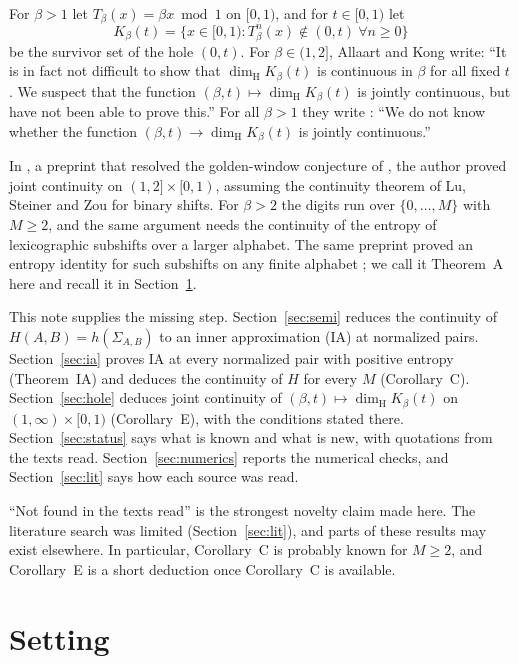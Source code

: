 \documentclass[11pt]{amsart}
\theoremstyle{definition}
\theoremstyle{remark}
\newcommand{\dimH}{\dim_{\mathrm H}}
\begin{document}
For $\beta>1$ let $T_\beta(x)=\beta x\bmod1$ on $[0,1)$, and for $t\in[0,1)$ let
\[
K_\beta(t)=\{x\in[0,1):T_\beta^n(x)\notin(0,t)\ \forall n\ge0\}
\]
be the survivor set of the hole $(0,t)$. For $\beta\in(1,2]$, Allaart and Kong \cite[Remark~1.10, arXiv v2]{AKcrit} write: ``It is in fact not difficult to show that $\dimH K_\beta(t)$ is continuous in $\beta$ for all fixed $t$. We suspect that the function $(\beta,t)\mapsto\dimH K_\beta(t)$ is jointly continuous, but have not been able to prove this.'' For all $\beta>1$ they write \cite[Remark~1.2, arXiv v3]{AKgen}: ``We do not know whether the function $(\beta,t)\to\dimH K_\beta(t)$ is jointly continuous.''

In \cite[Theorem~E]{Nem26}, a preprint that resolved the golden-window conjecture of \cite{v1}, the author proved joint continuity on $(1,2]\times[0,1)$, assuming the continuity theorem of Lu, Steiner and Zou \cite[Theorem~1.4]{LSZ} for binary shifts. For $\beta>2$ the digits run over $\{0,\dots,M\}$ with $M\ge2$, and the same argument needs the continuity of the entropy of lexicographic subshifts over a larger alphabet. The same preprint proved an entropy identity for such subshifts on any finite alphabet \cite[Theorem~7.1]{Nem26}; we call it Theorem~A here and recall it in Section~\ref{sec:setting}.

This note supplies the missing step. Section~\ref{sec:semi} reduces the continuity of $H(A,B)=h(\Sigma_{A,B})$ to an inner approximation (IA) at normalized pairs. Section~\ref{sec:ia} proves IA at every normalized pair with positive entropy (Theorem~IA) and deduces the continuity of $H$ for every $M$ (Corollary~C). Section~\ref{sec:hole} deduces joint continuity of $(\beta,t)\mapsto\dimH K_\beta(t)$ on $(1,\infty)\times[0,1)$ (Corollary~E), with the conditions stated there. Section~\ref{sec:status} says what is known and what is new, with quotations from the texts read. Section~\ref{sec:numerics} reports the numerical checks, and Section~\ref{sec:lit} says how each source was read.

``Not found in the texts read'' is the strongest novelty claim made here. The literature search was limited (Section~\ref{sec:lit}), and parts of these results may exist elsewhere. In particular, Corollary~C is probably known for $M\ge2$, and Corollary~E is a short deduction once Corollary~C is available.

\section{Setting}\label{sec:setting}
\end{document}
